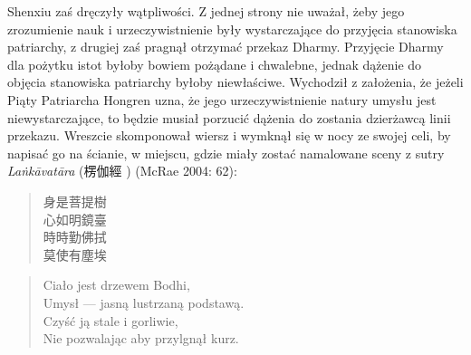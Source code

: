 Shenxiu zaś dręczyły wątpliwości. Z jednej strony nie uważał, żeby jego zrozumienie nauk i urzeczywistnienie były wystarczające do przyjęcia stanowiska patriarchy, z drugiej zaś pragnął otrzymać przekaz Dharmy. Przyjęcie Dharmy dla pożytku istot byłoby bowiem pożądane i chwalebne, jednak dążenie do objęcia stanowiska patriarchy byłoby niewłaściwe. Wychodził z założenia, że jeżeli Piąty Patriarcha Hongren uzna, że jego urzeczywistnienie natury umysłu jest niewystarczające, to będzie musiał porzucić dążenia do zostania dzierżawcą linii przekazu. Wreszcie skomponował wiersz i wymknął się w nocy ze swojej celi, by napisać go na ścianie, w miejscu, gdzie miały zostać namalowane sceny z sutry \textit{La\.nkāvatāra} (楞伽經 ) (McRae 2004: 62):

\vspace*{6pt}
\begin{minipage}[t]{0.4\textwidth}
\begin{verse}
身是菩提樹\\
心如明鏡臺\\
時時勤佛拭\\
莫使有塵埃
\end{verse}
\end{minipage}
\begin{minipage}[t]{0.6\textwidth}
\itshape
\begin{verse}
Ciało jest drzewem Bodhi,\\
Umysł --- jasną lustrzaną podstawą.\\
Czyść ją stale i gorliwie,\\
Nie pozwalając aby przylgnął kurz.\fnm
\end{verse}
\end{minipage}
\label{ShenxiuVerse}
\vspace*{6pt}

